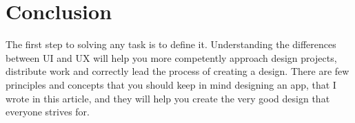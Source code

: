 \documentclass[10pt,twoside,english,a4paper]{article}
\begin{document}
\section{Conclusion}
The first step to solving any task is to define it. Understanding the
differences between UI and UX will help you more competently approach design projects, distribute work and correctly lead the process of creating a design. There are few principles and concepts that you should keep in mind designing an app, that I wrote in this article, and they will help you create the very good design that everyone strives for.	\cite{Kuusinen2014}








\end{document}
